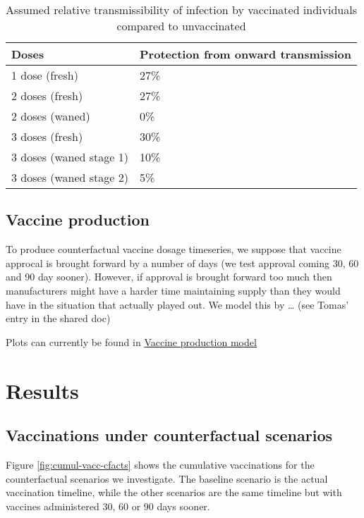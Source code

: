 \documentclass{article}
\begin{document}
\begin{table}

\caption{\label{tab:onward}Assumed relative transmissibility of infection by vaccinated individuals compared to unvaccinated}
\centering
\begin{tabular}[t]{ll}
\toprule
Doses & Protection from onward transmission\\
\midrule
1 dose (fresh) & 27\%\\
2 doses (fresh) & 27\%\\
2 doses (waned) & 0\%\\
3 doses (fresh) & 30\%\\
3 doses (waned stage 1) & 10\%\\
3 doses (waned stage 2) & 5\%\\
\bottomrule
\end{tabular}
\end{table}

\hypertarget{vaccine-production}{%
\subsection{Vaccine production}\label{vaccine-production}}

To produce counterfactual vaccine dosage timeseries, we suppose that vaccine approcal is brought forward by a number of days (we test approval coming 30, 60 and 90 day sooner). However, if approval is brought forward too much then manufacturers might have a harder time maintaining supply than they would have in the situation that actually played out. We model this by \ldots{} (see Tomas' entry in the shared doc)

Plots can currently be found in \protect\hyperlink{vaccine-production-model}{Vaccine production model}

\hypertarget{results}{%
\section{Results}\label{results}}

\hypertarget{vaccinations-under-counterfactual-scenarios}{%
\subsection{Vaccinations under counterfactual scenarios}\label{vaccinations-under-counterfactual-scenarios}}

Figure \ref{fig:cumul-vacc-cfacts} shows the cumulative vaccinations for the counterfactual scenarios we investigate. The baseline scenario is the actual vaccination timeline, while the other scenarios are the same timeline but with vaccines administered 30, 60 or 90 days sooner.
\end{document}

